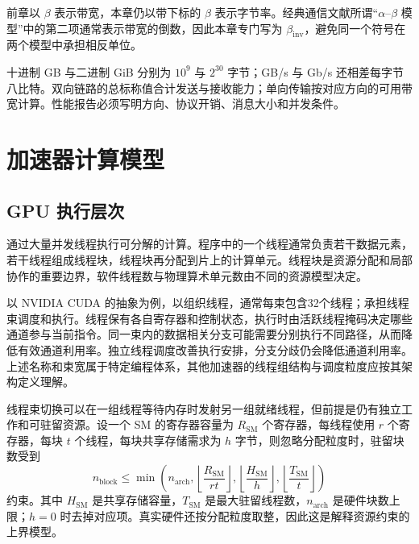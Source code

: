 \documentclass[../textbook.tex]{subfiles}
\begin{document}
前章以 $\beta$ 表示带宽，本章仍以带下标的 $\beta$ 表示字节率。经典通信文献所谓“$\alpha$--$\beta$ 模型”中的第二项通常表示带宽的倒数，因此本章专门写为 $\beta_{\mathrm{inv}}$，避免同一个符号在两个模型中承担相反单位。

十进制 GB 与二进制 GiB 分别为 $10^9$ 与 $2^{30}$ 字节；GB/s 与 Gb/s 还相差每字节八比特。双向链路的总标称值合计发送与接收能力；单向传输按对应方向的可用带宽计算。性能报告必须写明方向、协议开销、消息大小和并发条件。

\section{加速器计算模型}

\subsection{GPU 执行层次}
通过大量并发线程执行可分解的计算。程序中的一个线程通常负责若干数据元素，若干线程组成线程块，线程块再分配到片上的计算单元。线程块是资源分配和局部协作的重要边界，软件线程数与物理算术单元数由不同的资源模型决定。

以 NVIDIA CUDA 的抽象为例，以组织线程，通常每束包含32个线程；承担线程束调度和执行。线程保有各自寄存器和控制状态，执行时由活跃线程掩码决定哪些通道参与当前指令。同一束内的数据相关分支可能需要分别执行不同路径，从而降低有效通道利用率。独立线程调度改善执行安排，分支分歧仍会降低通道利用率。上述名称和束宽属于特定编程体系，其他加速器的线程组结构与调度粒度应按其架构定义理解。\cite{nvidia2026cudaguide}

线程束切换可以在一组线程等待内存时发射另一组就绪线程，但前提是仍有独立工作和可驻留资源。设一个 SM 的寄存器容量为 $R_{\mathrm{SM}}$ 个寄存器，每线程使用 $r$ 个寄存器，每块 $t$ 个线程，每块共享存储需求为 $h$ 字节，则忽略分配粒度时，驻留块数受到
\begin{equation}
 n_{\mathrm{block}}\leq
 \min\left(n_{\mathrm{arch}},
 \left\lfloor\frac{R_{\mathrm{SM}}}{rt}\right\rfloor,
 \left\lfloor\frac{H_{\mathrm{SM}}}{h}\right\rfloor,
 \left\lfloor\frac{T_{\mathrm{SM}}}{t}\right\rfloor\right)
\end{equation}
约束。其中 $H_{\mathrm{SM}}$ 是共享存储容量，$T_{\mathrm{SM}}$ 是最大驻留线程数，$n_{\mathrm{arch}}$ 是硬件块数上限；$h=0$ 时去掉对应项。真实硬件还按分配粒度取整，因此这是解释资源约束的上界模型。
\end{document}
